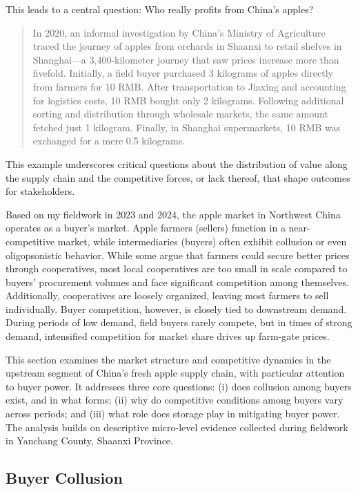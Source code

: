 This leads to a central question: Who really profits from China's apples?

\begin{quote}
    In 2020, an informal investigation by China's Ministry of Agriculture traced the journey of apples from orchards in Shaanxi to retail shelves in Shanghai---a 3,400-kilometer journey that saw prices increase more than fivefold. Initially, a field buyer purchased 3 kilograms of apples directly from farmers for 10 RMB. After transportation to Jiaxing and accounting for logistics costs, 10 RMB bought only 2 kilograms. Following additional sorting and distribution through wholesale markets, the same amount fetched just 1 kilogram. Finally, in Shanghai supermarkets, 10 RMB was exchanged for a mere 0.5 kilograms.
\end{quote}

This example underscores critical questions about the distribution of value along the supply chain and the competitive forces, or lack thereof, that shape outcomes for stakeholders.

Based on my fieldwork in 2023 and 2024, the apple market in Northwest China operates as a buyer's market. Apple farmers (sellers) function in a near-competitive market, while intermediaries (buyers) often exhibit collusion or even oligopsonistic behavior. While some argue that farmers could secure better prices through cooperatives, most local cooperatives are too small in scale compared to buyers' procurement volumes and face significant competition among themselves. Additionally, cooperatives are loosely organized, leaving most farmers to sell individually. Buyer competition, however, is closely tied to downstream demand. During periods of low demand, field buyers rarely compete, but in times of strong demand, intensified competition for market share drives up farm-gate prices.

This section examines the market structure and competitive dynamics in the upstream segment of China's fresh apple supply chain, with particular attention to buyer power. It addresses three core questions: (i) does collusion among buyers exist, and in what forms; (ii) why do competitive conditions among buyers vary across periods; and (iii) what role does storage play in mitigating buyer power. The analysis builds on descriptive micro-level evidence collected during fieldwork in Yanchang County, Shaanxi Province.

\subsection{Buyer Collusion}

